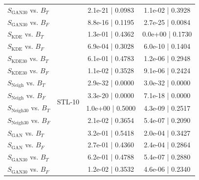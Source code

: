 \begin{table}[ht!]
\begin{minipage}[t]{0.98\textwidth}
{\begin{tabularx}{0.6\linewidth}{@{}lccc@{}}
$S_{\text{GAN}30}$ vs. $B_{T}$   &                            & 2.1e-21 | 0.0983          & 1.1e-02 | 0.3928          \\
$S_{\text{GAN}30}$ vs. $B_{F}$   &                            & 8.8e-16 | 0.1195          & 2.7e-25 | 0.0084          \\
\cmidrule(rl){1-1} \cmidrule(rl){2-2}  \cmidrule(rl){3-4} 
$S_{\text{KDE}}$ vs. $B_{T}$     & \multirow{12}{*}{STL-10}   & 1.3e-01 | 0.4362          & 0.0e+00 | 0.1730          \\
$S_{\text{KDE}}$ vs. $B_{F}$     &                            & 6.9e-04 | 0.3028          & 6.0e-10 | 0.1404          \\
$S_{\text{KDE}30}$ vs. $B_{T}$   &                            & 6.1e-01 | 0.4783          & 1.2e-06 | 0.2948          \\
$S_{\text{KDE}30}$ vs. $B_{F}$   &                            & 1.1e-02 | 0.3528          & 9.1e-06 | 0.2424          \\
$S_{\text{Neigh}}$ vs. $B_{T}$   &                            & 2.9e-32 | 0.0000          & 3.0e-32 | 0.0000          \\
$S_{\text{Neigh}}$ vs. $B_{F}$   &                            & 3.3e-20 | 0.0000          & 7.1e-18 | 0.0000          \\
$S_{\text{Neigh}30}$ vs. $B_{T}$ &                            & 1.0e+00 | 0.5000          & 4.3e-09 | 0.2517          \\
$S_{\text{Neigh}30}$ vs. $B_{F}$ &                            & 2.1e-02 | 0.3654          & 5.4e-07 | 0.2090          \\
$S_{\text{GAN}}$ vs. $B_{T}$     &                            & 3.2e-01 | 0.5418          & 2.0e-04 | 0.3427          \\
$S_{\text{GAN}}$ vs. $B_{F}$     &                            & 2.7e-01 | 0.4360          & 2.4e-04 | 0.2864          \\
$S_{\text{GAN}30}$ vs. $B_{T}$   &                            & 6.2e-01 | 0.4788          & 5.4e-07 | 0.2880          \\
$S_{\text{GAN}30}$ vs. $B_{F}$   &                            & 1.2e-02 | 0.3532          & 4.6e-06 | 0.2340         \\
\bottomrule
\end{tabularx}
}
\label{tab:test_natural_images}
\end{minipage}
\vspace{-.2in}
\end{table}

